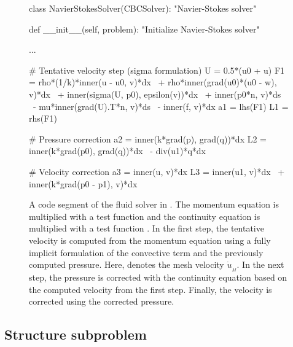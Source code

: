 \begin{figure}
  \begin{center}
\begin{python}
class NavierStokesSolver(CBCSolver):
    "Navier-Stokes solver"

    def __init__(self, problem):
        "Initialize Navier-Stokes solver"

        ...

        # Tentative velocity step (sigma formulation)
        U = 0.5*(u0 + u)
        F1 = rho*(1/k)*inner(u - u0, v)*dx \
           + rho*inner(grad(u0)*(u0 - w), v)*dx \
           + inner(sigma(U, p0), epsilon(v))*dx \
           + inner(p0*n, v)*ds \
           - mu*inner(grad(U).T*n, v)*ds \
           - inner(f, v)*dx
        a1 = lhs(F1)
        L1 = rhs(F1)

        # Pressure correction
        a2 = inner(k*grad(p), grad(q))*dx
        L2 = inner(k*grad(p0), grad(q))*dx \
           - div(u1)*q*dx

        # Velocity correction
        a3 = inner(u, v)*dx
        L3 = inner(u1, v)*dx \
           + inner(k*grad(p0 - p1), v)*dx
\end{python}
\caption{A code segment of the fluid solver in . The
  momentum equation is multiplied with a test function  and
  the continuity equation is multiplied with a test function
  \emp{q}. In the first step, the tentative velocity is computed
  from the momentum equation using a fully implicit formulation of the
  convective term and the previously computed pressure. Here, 
  denotes the mesh velocity $\dot{u}_{_{M}}$. In the next step, the
  pressure is corrected with the continuity equation based on the
  computed velocity \emp{u1} from the first step. Finally, the
  velocity is corrected using the corrected pressure.}
\label{selim:fig:fluidsolver}
  \end{center}
\end{figure}

\subsection{Structure subproblem}

